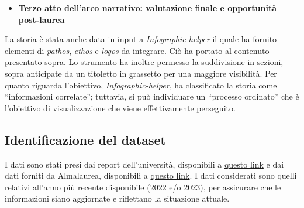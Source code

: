 \begin{itemize}
    \item \textbf{Terzo atto dell'arco narrativo: valutazione finale e opportunità post-laurea}
\end{itemize}
La storia è stata anche data in input a \emph{Infographic-helper} il quale ha fornito elementi di \emph{pathos}, \emph{ethos} e \emph{logos} da integrare.
Ciò ha portato al contenuto presentato sopra.
Lo strumento ha inoltre permesso la suddivisione in sezioni, sopra anticipate da un titoletto in grassetto per una maggiore visibilità.
Per quanto riguarda l'obiettivo, \emph{Infographic-helper}, ha classificato la storia come ``informazioni correlate''; tuttavia, si può individuare un ``processo ordinato'' 
che è l'obiettivo di visualizzazione che viene effettivamente perseguito.


\subsection{Identificazione del dataset}
I dati sono stati presi dai report dell'università, disponibili a \href{https://www.unipd.it/dati-statistici}{questo link} e dai dati forniti
da Almalaurea, disponibili a \href{https://apex.cca.unipd.it/pls/apex/f?p=144:32:::::P32_CODICIONE,P32_COD_CDS,P32_CODICE_SEDE,P32_TIPO_CORSO:0280106203100001,SC1167,PD,L2023}{questo link}.
I dati considerati sono quelli relativi all'anno più recente disponibile (2022 e/o 2023), per assicurare che le informazioni siano aggiornate e riflettano la situazione attuale.

